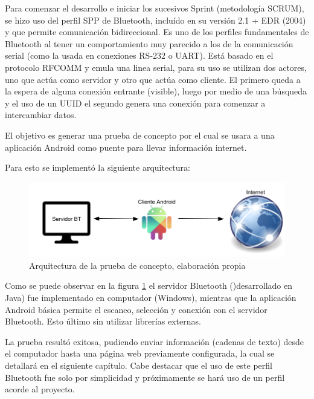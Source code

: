 Para comenzar el desarrollo e iniciar los sucesivos Sprint (metodología SCRUM), se hizo uso del perfil SPP de Bluetooth, incluído en su versión 2.1 + EDR (2004) y que permite comunicación bidireccional. Es uno de los perfiles fundamentales de Bluetooth al tener un comportamiento muy parecido a los de la comunicación serial (como la usada en conexiones RS-232 o UART).
Está basado en el protocolo RFCOMM y emula una linea serial, para su uso se utilizan dos actores, uno que actúa como servidor y otro que actúa como cliente. El primero queda a la espera de alguna conexión entrante (visible), luego por medio de una búsqueda y el uso de un UUID el segundo genera una conexión para comenzar a intercambiar datos.

El objetivo es generar una prueba de concepto por el cual se usara a una aplicación Android como puente para llevar información internet.

Para esto se implementó la siguiente arquitectura:

\begin{figure}[H]
	\centering
	\includegraphics[scale=0.4]{figuras/comunicacion/prueba.png}
	\caption{Arquitectura de la prueba de concepto, elaboración propia}
	\label{prueba_concept}
\end{figure}

Como se puede observar en la figura \ref{prueba_concept} el servidor Bluetooth ()desarrollado en Java) fue implementado en computador (Windows), mientras que la aplicación Android básica permite el escaneo, selección y conexión con el servidor Bluetooth. Esto último sin utilizar librerías externas.

La prueba resultó exitosa, pudiendo enviar información (cadenas de texto) desde el computador hasta una página web previamente configurada, la cual se detallará en el siguiente capítulo. Cabe destacar que el uso de este perfil Bluetooth fue solo por simplicidad y próximamente se hará uso de un perfil acorde al proyecto.